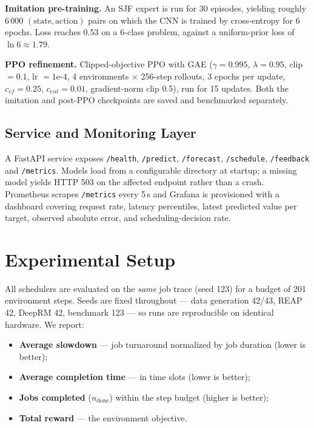 \documentclass[runningheads]{llncs}
\begin{document}
\textbf{Imitation pre-training.} An SJF expert is run for 30 episodes,
yielding roughly 6\,000 $(\text{state}, \text{action})$ pairs on which
the CNN is trained by cross-entropy for 6 epochs. Loss reaches 0.53 on
a 6-class problem, against a uniform-prior loss of $\ln 6 \approx
1.79$.

\textbf{PPO refinement.} Clipped-objective PPO with GAE
($\gamma = 0.995$, $\lambda = 0.95$, clip $= 0.1$, lr $= 1\text{e-}4$,
4 environments $\times$ 256-step rollouts, 3 epochs per update,
$c_{vf} = 0.25$, $c_{ent} = 0.01$, gradient-norm clip 0.5), run for 15
updates. Both the imitation and post-PPO checkpoints are saved and
benchmarked separately.

\subsection{Service and Monitoring Layer}

A FastAPI service exposes \texttt{/health}, \texttt{/predict},
\texttt{/forecast}, \texttt{/schedule}, \texttt{/feedback} and
\texttt{/metrics}. Models load from a configurable directory at
startup; a missing model yields HTTP 503 on the affected endpoint
rather than a crash. Prometheus scrapes \texttt{/metrics} every 5\,s
and Grafana is provisioned with a dashboard covering request rate,
latency percentiles, latest predicted value per target, observed
absolute error, and scheduling-decision rate.

\section{Experimental Setup}

All schedulers are evaluated on the \emph{same} job trace (seed 123)
for a budget of 201 environment steps. Seeds are fixed throughout ---
data generation 42/43, REAP 42, DeepRM 42, benchmark 123 --- so runs
are reproducible on identical hardware. We report:

\begin{itemize}
\item \textbf{Average slowdown} --- job turnaround normalized by
job duration (lower is better);
\item \textbf{Average completion time} --- in time slots
(lower is better);
\item \textbf{Jobs completed} ($n_{\text{done}}$) within the step
budget (higher is better);
\item \textbf{Total reward} --- the environment objective.
\end{itemize}
\end{document}

